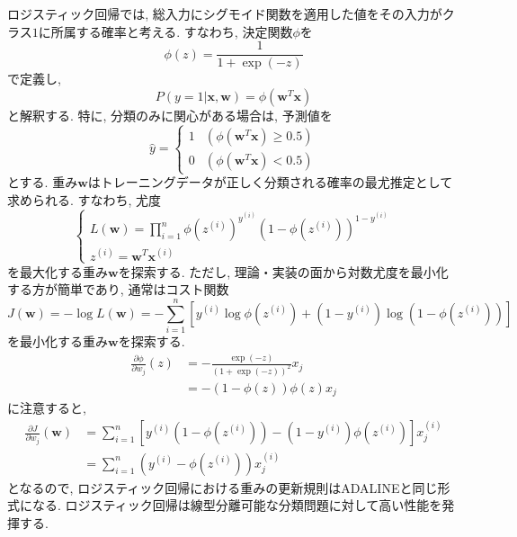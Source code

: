 \documentclass[uplatex]{jsarticle}
\theoremstyle{definition}
\numberwithin{equation}{section}
\begin{document}
ロジスティック回帰では, 総入力にシグモイド関数を適用した値をその入力がクラス$1$に所属する確率と考える.
すなわち, 決定関数$\phi$を
\begin{equation}
    \phi(z) = \frac{1}{1 + \exp(-z)}
\end{equation}
で定義し, 
\begin{equation}
    P(y = 1|\bm{x}, \bm{w}) = \phi(\bm{w}^{T}\bm{x})
\end{equation}
と解釈する.
特に, 分類のみに関心がある場合は, 予測値を
\begin{equation}
    \hat{y} = 
    \begin{cases}
        1 & (\phi(\bm{w}^{T}\bm{x}) \geq 0.5) \\
        0 & (\phi(\bm{w}^{T}\bm{x}) < 0.5)
    \end{cases}
\end{equation}
とする.
重み$\bm{w}$はトレーニングデータが正しく分類される確率の最尤推定として求められる.
すなわち, 尤度
\begin{equation}
    \begin{cases}
        L(\bm{w}) = \prod_{i = 1}^{n} \phi(z^{(i)})^{y^{(i)}}(1 - \phi(z^{(i)}))^{1 - y^{(i)}} \\
        z^{(i)} = \bm{w}^{T}\bm{x}^{(i)}
    \end{cases}
\end{equation}
を最大化する重み$\bm{w}$を探索する.
ただし, 理論・実装の面から対数尤度を最小化する方が簡単であり, 通常はコスト関数
\begin{equation}
    J(\bm{w}) = -\log L(\bm{w}) = -\sum_{i = 1}^{n} \left[y^{(i)}\log \phi(z^{(i)}) + (1 - y^{(i)})\log(1 - \phi(z^{(i)}))\right]
\end{equation}
を最小化する重み$\bm{w}$を探索する.
\begin{align}
    \frac{\partial \phi}{\partial w_{j}}(z)
    &= -\frac{\exp(-z)}{(1 + \exp(-z))^{2}}x_{j} \\
    &= -(1 - \phi(z))\phi(z)x_{j}
\end{align}
に注意すると, 
\begin{align}
    \frac{\partial J}{\partial w_{j}}(\bm{w})
    &= \sum_{i = 1}^{n} \left[y^{(i)}(1 - \phi(z^{(i)})) - (1 - y^{(i)})\phi(z^{(i)})\right]x^{(i)}_{j} \\
    &= \sum_{i = 1}^{n} (y^{(i)} - \phi(z^{(i)}))x^{(i)}_{j}
\end{align}
となるので, ロジスティック回帰における重みの更新規則はADALINEと同じ形式になる.
ロジスティック回帰は線型分離可能な分類問題に対して高い性能を発揮する.
\end{document}
